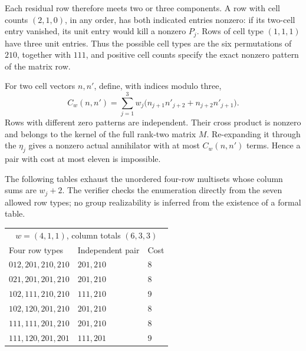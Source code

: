 \documentclass[11pt,a4paper,oneside]{report}
\theoremstyle{definition}
\theoremstyle{remark}
\begin{document}
Each residual row therefore meets two or three components. A row with
cell counts \((2,1,0)\), in any order, has both indicated entries
nonzero: if its two-cell entry vanished, its unit entry would kill a
nonzero \(P_j\). Rows of cell type \((1,1,1)\) have three unit entries.
Thus the possible cell types are the six permutations of \(210\),
together with \(111\), and positive cell counts specify the exact
nonzero pattern of the matrix row.

For two cell vectors \(n,n'\), define, with indices modulo three,
\begin{equation}\label{M11:six:cost}
 C_w(n,n')=
 \sum_{j=1}^3w_j
 \bigl(n_{j+1}n'_{j+2}+n_{j+2}n'_{j+1}\bigr).
\end{equation}
Rows with different zero patterns are independent. Their cross product
is nonzero and belongs to the kernel of the full rank-two matrix \(M\).
Re-expanding it through the \(\eta_j\) gives a nonzero actual annihilator
with at most \(C_w(n,n')\) terms. Hence a pair with cost at most eleven
is impossible.

The following tables exhaust the unordered four-row multisets whose
column sums are \(w_j+2\). The verifier checks the enumeration directly
from the seven allowed row types; no group realizability is inferred
from the existence of a formal table.

\begin{center}
\small
\begin{tabular}{lll}
\hline
\multicolumn{3}{c}{\(w=(4,1,1)\), column totals \((6,3,3)\)}\\
Four row types & Independent pair & Cost\\
\hline
\(012,201,210,210\)&\(201,210\)&8\\
\(021,201,201,210\)&\(201,210\)&8\\
\(102,111,210,210\)&\(111,210\)&9\\
\(102,120,201,210\)&\(201,210\)&8\\
\(111,111,201,210\)&\(201,210\)&8\\
\(111,120,201,201\)&\(111,201\)&9\\
\hline
\end{tabular}
\end{center}
\end{document}

